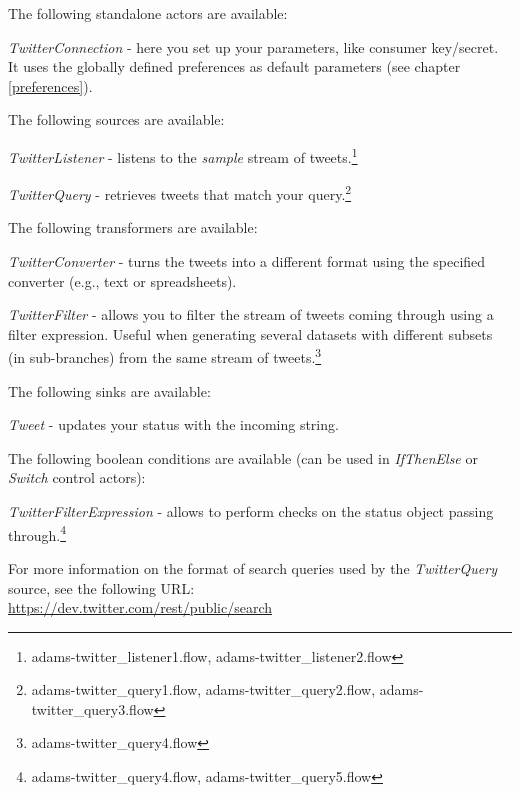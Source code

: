 \documentclass[a4paper]{book}
\begin{document}
\noindent The following standalone actors are available:
\begin{tight_itemize}
	\item \textit{TwitterConnection} - here you set up your parameters, like 
	consumer key/secret. It uses the globally defined preferences as default
	parameters (see chapter \ref{preferences}).
\end{tight_itemize}

\noindent The following sources are available:
\begin{tight_itemize}
	\item \textit{TwitterListener} - listens to the \textit{sample} stream
	of tweets.\footnote{adams-twitter\_listener1.flow, adams-twitter\_listener2.flow}
	\item \textit{TwitterQuery} - retrieves tweets that match your 
	query.\footnote{adams-twitter\_query1.flow, adams-twitter\_query2.flow, adams-twitter\_query3.flow}
\end{tight_itemize}

\noindent The following transformers are available:
\begin{tight_itemize}
	\item \textit{TwitterConverter} - turns the tweets into a different format
	using the specified converter (e.g., text or spreadsheets).
	\item \textit{TwitterFilter} - allows you to filter the stream of tweets
	coming through using a filter expression. Useful when generating several
	datasets with different subsets (in sub-branches) from the same stream 
	of tweets.\footnote{adams-twitter\_query4.flow}
\end{tight_itemize}

\noindent The following sinks are available:
\begin{tight_itemize}
	\item \textit{Tweet} - updates your status with the incoming string.
\end{tight_itemize}

\noindent The following boolean conditions are available (can be used in 
\textit{IfThenElse} or \textit{Switch} control actors):
\begin{tight_itemize}
	\item \textit{TwitterFilterExpression} - allows to perform checks on the 
	status object passing through.\footnote{adams-twitter\_query4.flow, adams-twitter\_query5.flow}
\end{tight_itemize}

For more information on the format of search queries used by the
\textit{TwitterQuery} source, see the following URL: \\
\url{https://dev.twitter.com/rest/public/search}{}
\end{document}
